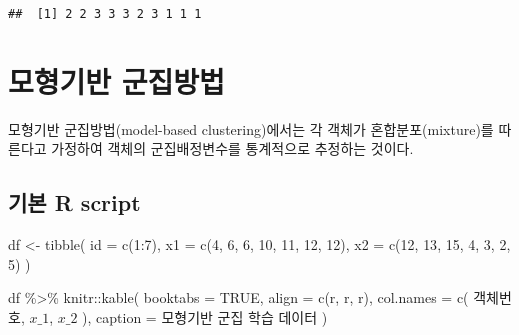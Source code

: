 \documentclass[
]{book}
\newenvironment{Shaded}{\begin{snugshade}}{\end{snugshade}}
\newcommand{\AttributeTok}[1]{\textcolor[rgb]{0.77,0.63,0.00}{#1}}
\newcommand{\ConstantTok}[1]{\textcolor[rgb]{0.00,0.00,0.00}{#1}}
\newcommand{\DecValTok}[1]{\textcolor[rgb]{0.00,0.00,0.81}{#1}}
\newcommand{\FunctionTok}[1]{\textcolor[rgb]{0.00,0.00,0.00}{#1}}
\newcommand{\NormalTok}[1]{#1}
\newcommand{\OtherTok}[1]{\textcolor[rgb]{0.56,0.35,0.01}{#1}}
\newcommand{\SpecialCharTok}[1]{\textcolor[rgb]{0.00,0.00,0.00}{#1}}
\newcommand{\StringTok}[1]{\textcolor[rgb]{0.31,0.60,0.02}{#1}}
\begin{document}
\begin{verbatim}
##  [1] 2 2 3 3 3 2 3 1 1 1
\end{verbatim}

\hypertarget{model-based-clustering}{%
\section{모형기반 군집방법}\label{model-based-clustering}}

모형기반 군집방법(model-based clustering)에서는 각 객체가 혼합분포(mixture)를 따른다고 가정하여 객체의 군집배정변수를 통계적으로 추정하는 것이다.

\hypertarget{model-based-clustering-basic-script}{%
\subsection{기본 R script}\label{model-based-clustering-basic-script}}

\begin{Shaded}
\begin{Highlighting}[]
\NormalTok{df }\OtherTok{\textless{}{-}} \FunctionTok{tibble}\NormalTok{(}
  \AttributeTok{id =} \FunctionTok{c}\NormalTok{(}\DecValTok{1}\SpecialCharTok{:}\DecValTok{7}\NormalTok{),}
  \AttributeTok{x1 =} \FunctionTok{c}\NormalTok{(}\DecValTok{4}\NormalTok{, }\DecValTok{6}\NormalTok{, }\DecValTok{6}\NormalTok{, }\DecValTok{10}\NormalTok{, }\DecValTok{11}\NormalTok{, }\DecValTok{12}\NormalTok{, }\DecValTok{12}\NormalTok{),}
  \AttributeTok{x2 =} \FunctionTok{c}\NormalTok{(}\DecValTok{12}\NormalTok{, }\DecValTok{13}\NormalTok{, }\DecValTok{15}\NormalTok{, }\DecValTok{4}\NormalTok{, }\DecValTok{3}\NormalTok{, }\DecValTok{2}\NormalTok{, }\DecValTok{5}\NormalTok{)}
\NormalTok{)}

\NormalTok{df }\SpecialCharTok{\%\textgreater{}\%}
\NormalTok{  knitr}\SpecialCharTok{::}\FunctionTok{kable}\NormalTok{(}
    \AttributeTok{booktabs =} \ConstantTok{TRUE}\NormalTok{,}
    \AttributeTok{align =} \FunctionTok{c}\NormalTok{(}\StringTok{\textquotesingle{}r\textquotesingle{}}\NormalTok{, }\StringTok{\textquotesingle{}r\textquotesingle{}}\NormalTok{, }\StringTok{\textquotesingle{}r\textquotesingle{}}\NormalTok{),}
    \AttributeTok{col.names =} \FunctionTok{c}\NormalTok{(}
      \StringTok{\textquotesingle{}객체번호\textquotesingle{}}\NormalTok{, }
      \StringTok{\textquotesingle{}$x\_1$\textquotesingle{}}\NormalTok{, }
      \StringTok{\textquotesingle{}$x\_2$\textquotesingle{}}
\NormalTok{      ),}
    \AttributeTok{caption =} \StringTok{\textquotesingle{}모형기반 군집 학습 데이터\textquotesingle{}}
\NormalTok{  )}
\end{Highlighting}
\end{Shaded}
\end{document}
